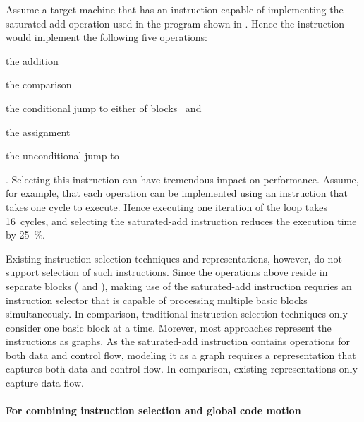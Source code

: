 Assume a \gls{target machine} that has an instruction capable of implementing
the saturated-add \gls{operation} used in the \gls{program} shown in
.
%
Hence the \gls{instruction} would implement the following five operations:
%
\begin{inlinelist}[itemjoin={, }, itemjoin*={, and}]
  \item the  addition
  \item the  comparison
  \item the conditional jump to either of blocks~ and~
  \item the  assignment
  \item the unconditional jump to~
\end{inlinelist}.
%
Selecting this \gls{instruction} can have tremendous impact on performance.
%
Assume, for example, that each \gls{operation} can be implemented using an
\gls{instruction} that takes one cycle to execute. Hence executing one iteration
of the loop takes \num{16}~cycles, and selecting the saturated-add
\gls{instruction} reduces the execution time by \SI{25}{\percent}.

Existing \gls{instruction selection} techniques and representations, however, do
not support selection of such \glspl{instruction}.
%
Since the \glspl{operation} above reside in separate \glspl{block} (
and ), making use of the saturated-add \gls{instruction} requries an
\gls{instruction selector} that is capable of processing multiple \glspl{basic
  block} simultaneously.
%
In comparison, traditional \gls{instruction selection} techniques only consider
one \gls{basic block} at a time.
%
Morever, most approaches represent the \glspl{instruction} as \glspl{graph}.
%
As the saturated-add \gls{instruction} contains \glspl{operation} for both data
and control flow, modeling it as a \gls{graph} requires a representation that
captures both data and control flow.
%
In comparison, existing representations only capture data flow.



\paragraph{For combining instruction selection and global code motion}

